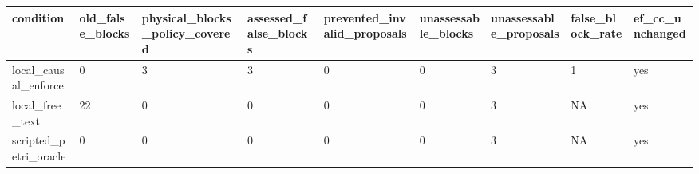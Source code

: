 \begin{tabular}{lllllllll}
\hline
condition & old\_false\_blocks & physical\_blocks\_policy\_covered & assessed\_false\_blocks & prevented\_invalid\_proposals & unassessable\_blocks & unassessable\_proposals & false\_block\_rate & ef\_cc\_unchanged \\
\hline
local\_causal\_enforce & 0 & 3 & 3 & 0 & 0 & 3 & 1 & yes \\
local\_free\_text & 22 & 0 & 0 & 0 & 0 & 3 & NA & yes \\
scripted\_petri\_oracle & 0 & 0 & 0 & 0 & 0 & 3 & NA & yes \\
\hline
\end{tabular}
